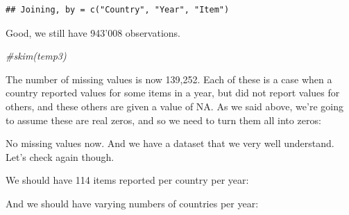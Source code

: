\documentclass[]{book}
\newenvironment{Shaded}{\begin{snugshade}}{\end{snugshade}}
\newcommand{\CommentTok}[1]{\textcolor[rgb]{0.56,0.35,0.01}{\textit{#1}}}
\newcommand{\DataTypeTok}[1]{\textcolor[rgb]{0.13,0.29,0.53}{#1}}
\newcommand{\DecValTok}[1]{\textcolor[rgb]{0.00,0.00,0.81}{#1}}
\newcommand{\KeywordTok}[1]{\textcolor[rgb]{0.13,0.29,0.53}{\textbf{#1}}}
\newcommand{\NormalTok}[1]{#1}
\newcommand{\OperatorTok}[1]{\textcolor[rgb]{0.81,0.36,0.00}{\textbf{#1}}}
\newcommand{\StringTok}[1]{\textcolor[rgb]{0.31,0.60,0.02}{#1}}
\begin{document}
\begin{verbatim}
## Joining, by = c("Country", "Year", "Item")
\end{verbatim}

Good, we still have 943'008 observations.

\begin{Shaded}
\begin{Highlighting}[]
\CommentTok{#skim(temp3)}
\end{Highlighting}
\end{Shaded}

The number of missing values is now 139,252. Each of these is a case when a country reported values for some items in a year, but did not report values for others, and these others are given a value of NA. As we said above, we're going to assume these are real zeros, and so we need to turn them all into zeros:

\begin{Shaded}
\end{Shaded}

No missing values now. And we have a dataset that we very well understand. Let's check again though.

We should have 114 items reported per country per year:

\begin{Shaded}
\end{Shaded}

And we should have varying numbers of countries per year:

\begin{Shaded}
\end{Shaded}
\end{document}
